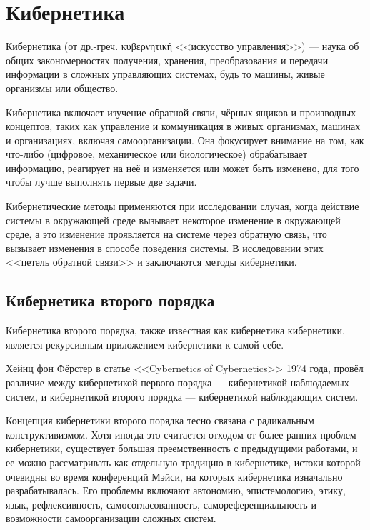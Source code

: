 \documentclass[a4page]{article}
\begin{document}
\newpage
\section{Кибернетика}
Кибернетика (от др.-греч. κυβερνητική <<искусство управления>>) — наука об общих закономерностях получения, хранения, преобразования и передачи информации в сложных управляющих системах, будь то машины, живые организмы или общество\cite{ruwiki:cybernetics}.

Кибернетика включает изучение обратной связи, чёрных ящиков и производных концептов, таких как управление и коммуникация в живых организмах, машинах и организациях, включая самоорганизации. Она фокусирует внимание на том, как что-либо (цифровое, механическое или биологическое) обрабатывает информацию, реагирует на неё и изменяется или может быть изменено, для того чтобы лучше выполнять первые две задачи\cite{out_of_control}.

Кибернетические методы применяются при исследовании случая, когда действие системы в окружающей среде вызывает некоторое изменение в окружающей среде, а это изменение проявляется на системе через обратную связь, что вызывает изменения в способе поведения системы. В исследовании этих <<петель обратной связи>> и заключаются методы кибернетики.

\subsection{Кибернетика второго порядка}
Кибернетика второго порядка, также известная как кибернетика кибернетики, является рекурсивным приложением кибернетики к самой себе.

Хейнц фон Фёрстер в статье <<Cybernetics of Cybernetics>> 1974 года, провёл различие между кибернетикой первого порядка — кибернетикой наблюдаемых систем, и кибернетикой второго порядка — кибернетикой наблюдающих систем\cite{cybernetics_of_cybernetics}.

Концепция кибернетики второго порядка тесно связана с радикальным конструктивизмом. Хотя иногда это считается отходом от более ранних проблем кибернетики, существует большая преемственность с предыдущими работами, и ее можно рассматривать как отдельную традицию в кибернетике, истоки которой очевидны во время конференций Мэйси, на которых кибернетика изначально разрабатывалась. Его проблемы включают автономию, эпистемологию, этику, язык, рефлексивность, самосогласованность, самореференциальность и возможности самоорганизации сложных систем.
\end{document}

